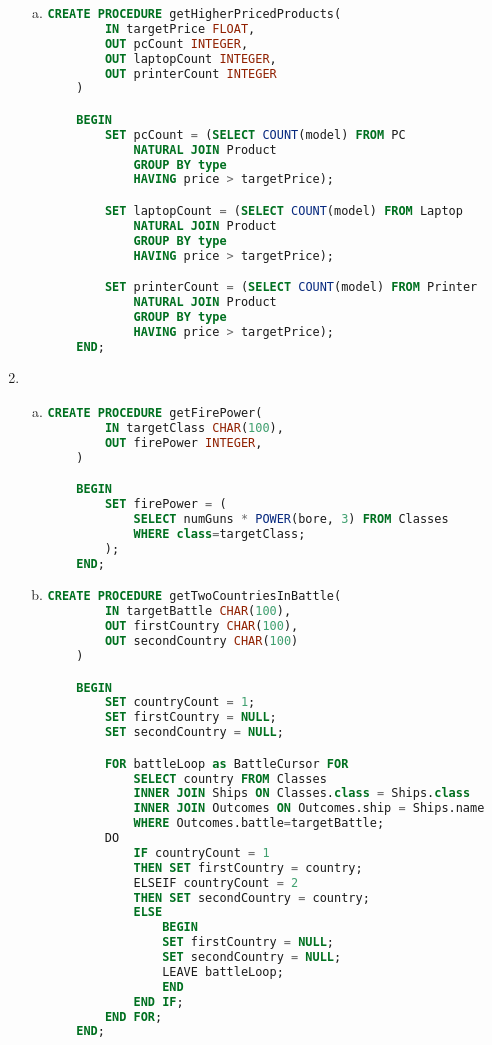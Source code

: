 \documentclass[12pt]{article}
\begin{document}
\begin{enumerate}[1.]
\begin{enumerate}[a)]
        \item

    \begin{lstlisting}[language=SQL]
    CREATE PROCEDURE getHigherPricedProducts(
        IN targetPrice FLOAT,
        OUT pcCount INTEGER,
        OUT laptopCount INTEGER,
        OUT printerCount INTEGER
    )

    BEGIN
        SET pcCount = (SELECT COUNT(model) FROM PC
            NATURAL JOIN Product
            GROUP BY type
            HAVING price > targetPrice);

        SET laptopCount = (SELECT COUNT(model) FROM Laptop
            NATURAL JOIN Product
            GROUP BY type
            HAVING price > targetPrice);

        SET printerCount = (SELECT COUNT(model) FROM Printer
            NATURAL JOIN Product
            GROUP BY type
            HAVING price > targetPrice);
    END;
    \end{lstlisting}

    \end{enumerate}

    \item

    \begin{enumerate}[a)]
        \item

    \begin{lstlisting}[language=SQL]
    CREATE PROCEDURE getFirePower(
        IN targetClass CHAR(100),
        OUT firePower INTEGER,
    )

    BEGIN
        SET firePower = (
            SELECT numGuns * POWER(bore, 3) FROM Classes
            WHERE class=targetClass;
        );
    END;
    \end{lstlisting}

        \item

    \begin{lstlisting}[language=SQL]
    CREATE PROCEDURE getTwoCountriesInBattle(
        IN targetBattle CHAR(100),
        OUT firstCountry CHAR(100),
        OUT secondCountry CHAR(100)
    )

    BEGIN
        SET countryCount = 1;
        SET firstCountry = NULL;
        SET secondCountry = NULL;

        FOR battleLoop as BattleCursor FOR
            SELECT country FROM Classes
            INNER JOIN Ships ON Classes.class = Ships.class
            INNER JOIN Outcomes ON Outcomes.ship = Ships.name
            WHERE Outcomes.battle=targetBattle;
        DO
            IF countryCount = 1
            THEN SET firstCountry = country;
            ELSEIF countryCount = 2
            THEN SET secondCountry = country;
            ELSE
                BEGIN
                SET firstCountry = NULL;
                SET secondCountry = NULL;
                LEAVE battleLoop;
                END
            END IF;
        END FOR;
    END;
    \end{lstlisting}


\end{enumerate}
\end{enumerate}
\end{document}
